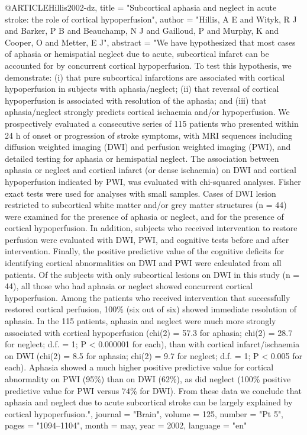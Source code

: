 @ARTICLE{Hillis2002-dz,
	title    = "Subcortical aphasia and neglect in acute stroke: the role of
	cortical hypoperfusion",
	author   = "Hillis, A E and Wityk, R J and Barker, P B and Beauchamp, N J and
	Gailloud, P and Murphy, K and Cooper, O and Metter, E J",
	abstract = "We have hypothesized that most cases of aphasia or hemispatial
	neglect due to acute, subcortical infarct can be accounted for by
	concurrent cortical hypoperfusion. To test this hypothesis, we
	demonstrate: (i) that pure subcortical infarctions are associated
	with cortical hypoperfusion in subjects with aphasia/neglect;
	(ii) that reversal of cortical hypoperfusion is associated with
	resolution of the aphasia; and (iii) that aphasia/neglect
	strongly predicts cortical ischaemia and/or hypoperfusion. We
	prospectively evaluated a consecutive series of 115 patients who
	presented within 24 h of onset or progression of stroke symptoms,
	with MRI sequences including diffusion weighted imaging (DWI) and
	perfusion weighted imaging (PWI), and detailed testing for
	aphasia or hemispatial neglect. The association between aphasia
	or neglect and cortical infarct (or dense ischaemia) on DWI and
	cortical hypoperfusion indicated by PWI, was evaluated with
	chi-squared analyses. Fisher exact tests were used for analyses
	with small samples. Cases of DWI lesion restricted to subcortical
	white matter and/or grey matter structures (n = 44) were examined
	for the presence of aphasia or neglect, and for the presence of
	cortical hypoperfusion. In addition, subjects who received
	intervention to restore perfusion were evaluated with DWI, PWI,
	and cognitive tests before and after intervention. Finally, the
	positive predictive value of the cognitive deficits for
	identifying cortical abnormalities on DWI and PWI were calculated
	from all patients. Of the subjects with only subcortical lesions
	on DWI in this study (n = 44), all those who had aphasia or
	neglect showed concurrent cortical hypoperfusion. Among the
	patients who received intervention that successfully restored
	cortical perfusion, 100\% (six out of six) showed immediate
	resolution of aphasia. In the 115 patients, aphasia and neglect
	were much more strongly associated with cortical hypoperfusion
	(chi(2) = 57.3 for aphasia; chi(2) = 28.7 for neglect; d.f. = 1;
	P < 0.000001 for each), than with cortical infarct/ischaemia on
	DWI (chi(2) = 8.5 for aphasia; chi(2) = 9.7 for neglect; d.f. =
	1; P < 0.005 for each). Aphasia showed a much higher positive
	predictive value for cortical abnormality on PWI (95\%) than on
	DWI (62\%), as did neglect (100\% positive predictive value for
	PWI versus 74\% for DWI). From these data we conclude that
	aphasia and neglect due to acute subcortical stroke can be
	largely explained by cortical hypoperfusion.",
	journal  = "Brain",
	volume   =  125,
	number   = "Pt 5",
	pages    = "1094--1104",
	month    =  may,
	year     =  2002,
	language = "en"
}

